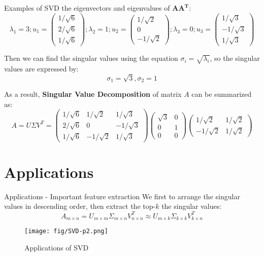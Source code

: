 \documentclass[10pt]{beamer}
\begin{document}
\begin{frame}[fragile]{Examples of SVD}
  the eigenvectors and eigenvalues of $\mathbf{AA^T}$:
  $$\lambda_1= 3; u_1 = \left( \begin{array}{ccc} 1/\sqrt{6} \\ 2/\sqrt{6} \\ 1/\sqrt{6} \end{array} \right); \lambda_2= 1; u_2 = \left( \begin{array}{ccc} 1/\sqrt{2} \\ 0 \\ -1/\sqrt{2} \end{array} \right);  \lambda_3= 0; u_3 = \left( \begin{array}{ccc} 1/\sqrt{3} \\ -1/\sqrt{3} \\ 1/\sqrt{3} \end{array} \right)$$
  
  Then we can find the singular values using the equation $\sigma_i = \sqrt{\lambda_i}$, so the singular values are expressed by: $$\sigma_1 = \sqrt{3}, \sigma_2=1$$

  As a result, \textbf{Singular Value Decomposition} of matrix $A$ can be summarized as:
  $$A=U\Sigma V^T = \left( \begin{array}{ccc} 1/\sqrt{6} & 1/\sqrt{2} & 1/\sqrt{3} \\ 2/\sqrt{6} & 0 & -1/\sqrt{3}\\ 1/\sqrt{6} & -1/\sqrt{2} & 1/\sqrt{3} \end{array} \right) \left( \begin{array}{ccc} \sqrt{3} & 0 \\  0 & 1\\ 0 & 0 \end{array} \right) \left( \begin{array}{ccc} 1/\sqrt{2}  & 1/\sqrt{2}  \\ -1/\sqrt{2}  & 1/\sqrt{2}  \end{array} \right)$$
\end{frame}

\section{Applications}

\begin{frame}{Applications - Important feature extraction}
  We first to arrange the singular values in descending order, then extract the top-$k$ the singular values:
  $$A_{m \times n} = U_{m \times m}\Sigma_{m \times n} V^T_{n \times n} \approx U_{m \times k}\Sigma_{k \times k} V^T_{k \times n}$$
  \begin{figure}[htbp]
    \centering
    \texttt{[image: fig/SVD-p2.png]}
    \caption{Applications of SVD}
  \end{figure}
\end{frame}
\end{document}
